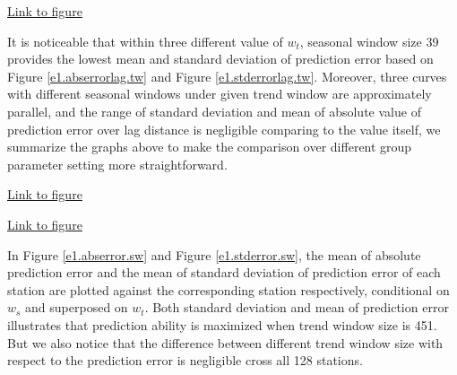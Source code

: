 \begin{framed}
\begin{center}
  \href{../plots/a1950/E1/tmax.std.vs.lag.tw.pdf}{Link to figure}
  \label{e1.stderrorlag.tw}
\end{center}
\end{framed}

It is noticeable that within three different value of $w_t$, seasonal window size
39 provides the lowest mean and standard deviation of prediction error based on 
Figure 
\href{../plots/a1950/E1/tmax.absmeans.vs.lag.tw.pdf}{\ref*{e1.abserrorlag.tw}} 
and Figure 
\href{../plots/a1950/E1/tmax.std.vs.lag.tw.pdf}{\ref*{e1.stderrorlag.tw}}.
Moreover, three curves with different seasonal windows under given trend window 
are approximately parallel, and the range of standard deviation and mean of 
absolute value of prediction error over lag distance is negligible comparing to 
the value itself, we summarize the graphs above to make the comparison over 
different group parameter setting more straightforward.

\begin{framed}
\begin{center}
  \href{../plots/a1950/E1/tmax.mean.absmeans.error.sw.pdf}{Link to figure}
  \label{e1.abserror.sw}
\end{center}
\end{framed}

\begin{framed}
\begin{center}
  \href{../plots/a1950/E1/tmax.mean.std.error.sw.pdf}{Link to figure}
  \label{e1.stderror.sw}
\end{center}
\end{framed}

In Figure \href{../plots/tmax.mean.absmeans.error.tw.pdf}{\ref*{e1.abserror.sw}}
and Figure \href{../plots/tmax.mean.std.error.tw.pdf}{\ref*{e1.stderror.sw}}, 
the mean of absolute prediction error and the mean of standard deviation of 
prediction error of each station are plotted against the corresponding station
respectively, conditional on $w_s$ and superposed on $w_t$. Both standard 
deviation and mean of prediction error illustrates that prediction ability is
maximized when trend window size is 451. But we also notice that the difference
between different trend window size with respect to the prediction error is 
negligible cross all 128 stations. 

